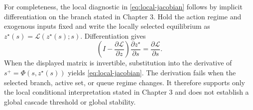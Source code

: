 \documentclass[a4paper,fleqn]{cas-sc}
\begin{document}
For completeness, the local diagnostic in \cref{eq:local-jacobian} follows by
implicit differentiation on the branch stated in Chapter 3. Hold the action
regime and exogenous inputs fixed and write the locally selected equilibrium as
$z^\star(s)=\mathcal L(z^\star(s);s)$. Differentiation gives
\[
 \left(I-\frac{\partial\mathcal L}{\partial z}\right)
 \frac{\partial z^\star}{\partial s}
 =\frac{\partial\mathcal L}{\partial s}.
\]
When the displayed matrix is invertible, substitution into the derivative of
$s^+=\Phi(s,z^\star(s))$ yields \cref{eq:local-jacobian}. The derivation fails
when the selected branch, active set, or queue regime changes. It therefore
supports only the local conditional interpretation stated in Chapter 3 and
does not establish a global cascade threshold or global stability.
\end{document}
